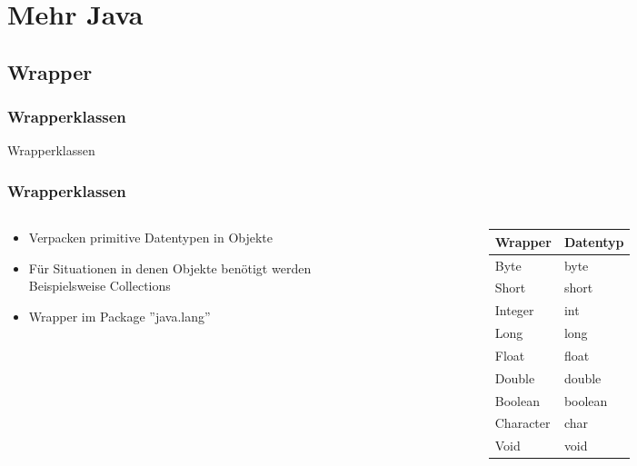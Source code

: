 \section{Mehr Java} 
\subsection{Wrapper}
\begin{frame}[fragile]
	\frametitle{Wrapperklassen}
\huge Wrapperklassen
\end{frame}

\begin{frame}[fragile]
	\frametitle{Wrapperklassen}
	\begin{columns}
		\begin{column}{0.5\textwidth}
			\small
			\begin{itemize}
			  \item Verpacken primitive Datentypen in Objekte
			  \item F\"ur Situationen in denen Objekte ben\"otigt 
			  werden\\
			  Beispielsweise Collections
			  \item Wrapper im Package ''java.lang''
			\end{itemize}
		\end{column}
		\begin{column}{0.5\textwidth}
			\begin{table}
				\begin{small}
					\begin{tabular}{l|l}
					Wrapper & Datentyp \\ \hline
					Byte & byte \\
					Short & short \\
					Integer & int \\ 
					Long & long \\
					Float & float \\
					Double & double \\
					Boolean & boolean \\
					Character & char \\
					Void & void
					\end{tabular}
				\end{small}
			\end{table}
		\end{column}
	\end{columns}
\end{frame}

